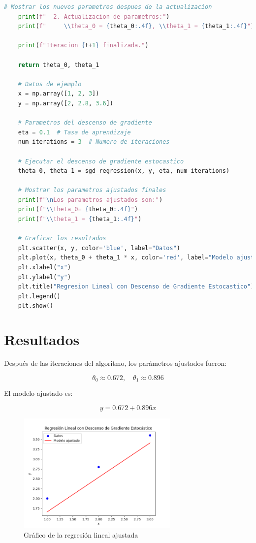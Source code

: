 \documentclass{article}
\begin{document}
\begin{lstlisting}[language=Python, caption=Regresión Lineal con SGD, frame=single]
	# Mostrar los nuevos parametros despues de la actualizacion
	print(f"  2. Actualizacion de parametros:")
	print(f"     \\theta_0 = {theta_0:.4f}, \\theta_1 = {theta_1:.4f}")
	
	print(f"Iteracion {t+1} finalizada.")
	
	return theta_0, theta_1
	
	# Datos de ejemplo
	x = np.array([1, 2, 3])
	y = np.array([2, 2.8, 3.6])
	
	# Parametros del descenso de gradiente
	eta = 0.1  # Tasa de aprendizaje
	num_iterations = 3  # Numero de iteraciones
	
	# Ejecutar el descenso de gradiente estocastico
	theta_0, theta_1 = sgd_regression(x, y, eta, num_iterations)
	
	# Mostrar los parametros ajustados finales
	print(f"\nLos parametros ajustados son:")
	print(f"\\theta_0= {theta_0:.4f}")
	print(f"\\theta_1 = {theta_1:.4f}")
	
	# Graficar los resultados
	plt.scatter(x, y, color='blue', label="Datos")
	plt.plot(x, theta_0 + theta_1 * x, color='red', label="Modelo ajustado")
	plt.xlabel("x")
	plt.ylabel("y")
	plt.title("Regresion Lineal con Descenso de Gradiente Estocastico")
	plt.legend()
	plt.show()
\end{lstlisting}

\section*{Resultados}

Después de las iteraciones del algoritmo, los parámetros ajustados fueron:

\[
\theta_0 \approx 0.672, \quad \theta_1 \approx 0.896
\]

El modelo ajustado es:

\[
y = 0.672 + 0.896x
\]

\begin{figure}[h]
	\centering
	\includegraphics[width=0.7\textwidth]{modelo_ajustado.png}
	\caption{Gráfico de la regresión lineal ajustada}
\end{figure}
\end{document}
